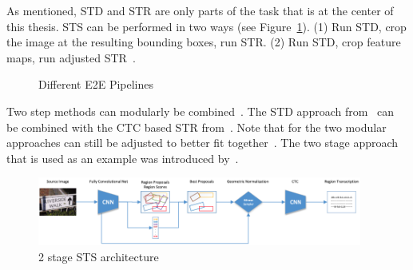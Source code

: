 As mentioned, \ac{STD} and \ac{STR} are only parts of the task that is at the center of this thesis.
\ac{STS} can be performed in two ways (see Figure~\ref{fig:e2e-pipelines}).
(1) Run \ac{STD}, crop the image at the resulting bounding boxes, run \ac{STR}.
(2) Run \ac{STD}, crop feature maps, run adjusted \ac{STR}~\citep{chen_text_2021,long_scene_2021}.

\begin{figure}[b]
    \centering
    
    \caption{Different E2E Pipelines\label{fig:e2e-pipelines}}
\end{figure}
Two step methods can modularly be combined~\citep{liao_textboxes_2017}.
The \ac{STD} approach from~\cite{liao_textboxes_2017} can be combined with the CTC based \ac{STR}
from~\cite{shi_end--end_2017}.
Note that for the two modular approaches can still be adjusted to better fit
together~\citep{liao_textboxes_2017}.
The two stage approach that is used as an example was introduced by~\cite{busta_deep_2017}.
\begin{figure}[h]
    \centering
    \includegraphics[width=0.95\textwidth]{img/E2E-two-stage-architecture-Bust-Deep-2017.png}
    \caption[2 stage STS architecture]{%
        2 stage STS architecture~\citep{busta_deep_2017}\label{fig:e2e-2-stage}
    }
\end{figure}
